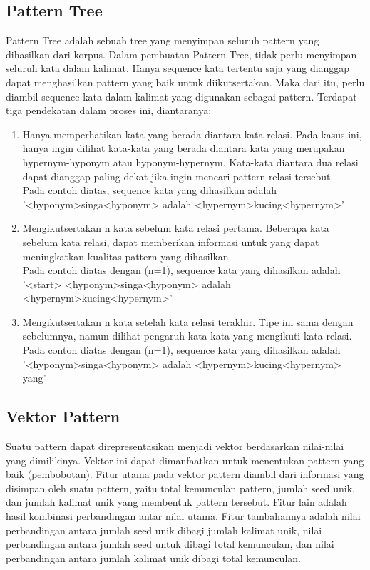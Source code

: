 \subsection{Pattern Tree}
Pattern Tree adalah sebuah tree yang menyimpan seluruh pattern yang dihasilkan dari korpus. Dalam pembuatan Pattern Tree, tidak perlu menyimpan seluruh kata dalam kalimat. Hanya sequence kata tertentu saja yang dianggap dapat menghasilkan pattern yang baik untuk diikutsertakan. Maka dari itu, perlu diambil sequence kata dalam kalimat yang digunakan sebagai pattern. Terdapat tiga pendekatan dalam proses ini, diantaranya:
\begin{enumerate}
  \item Hanya memperhatikan kata yang berada diantara kata relasi. Pada kasus ini, hanya ingin dilihat kata-kata yang berada diantara kata yang merupakan hypernym-hyponym atau hyponym-hypernym. Kata-kata diantara dua relasi dapat dianggap paling dekat jika ingin mencari pattern relasi tersebut. \\Pada contoh diatas, sequence kata yang dihasilkan adalah '<hyponym>singa<hyponym> adalah <hypernym>kucing<hypernym>'
  \item Mengikutsertakan n kata sebelum kata relasi pertama. Beberapa kata sebelum kata relasi, dapat memberikan informasi untuk yang dapat meningkatkan kualitas pattern yang dihasilkan.\\
  Pada contoh diatas dengan (n=1), sequence kata yang dihasilkan adalah '<start> <hyponym>singa<hyponym> adalah <hypernym>kucing<hypernym>'
  \item Mengikutsertakan n kata setelah kata relasi terakhir. Tipe ini sama dengan sebelumnya, namun dilihat pengaruh kata-kata yang mengikuti kata relasi. \\
  Pada contoh diatas dengan (n=1), sequence kata yang dihasilkan adalah '<hyponym>singa<hyponym> adalah <hypernym>kucing<hypernym> yang'
\end{enumerate}

\subsection{Vektor Pattern}
Suatu pattern dapat direpresentasikan menjadi vektor berdasarkan nilai-nilai yang dimilikinya. Vektor ini dapat dimanfaatkan untuk menentukan pattern yang baik (pembobotan). Fitur utama pada vektor pattern diambil dari informasi yang disimpan oleh suatu pattern, yaitu total kemunculan pattern, jumlah seed unik, dan jumlah kalimat unik yang membentuk pattern tersebut. Fitur lain adalah hasil kombinasi perbandingan antar nilai utama. Fitur tambahannya adalah nilai perbandingan antara jumlah seed unik dibagi jumlah kalimat unik, nilai perbandingan antara jumlah seed untuk dibagi total kemunculan, dan nilai perbandingan antara jumlah kalimat unik dibagi total kemunculan.


